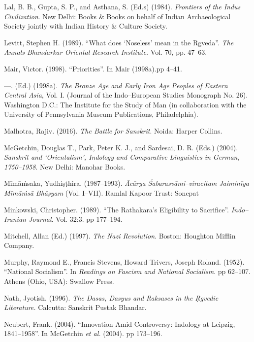 \begin{thebibliography}{99}
  Lal, B. B., Gupta, S. P., and Asthana, S. (Ed.s) (1984).\textit{ Frontiers of the Indus Civilization}. New Delhi: Books \& Books on behalf of Indian Archaeological Society jointly with Indian History \& Culture Society.

  Levitt, Stephen H. (1989). “What does ‘Noseless’ mean in the Rgveda”. \textit{The Annals Bhandarkar Oriental Research Institute.} Vol. 70, pp. 47–63.

  Mair, Victor. (1998). “Priorities”. In Mair (1998a).pp 4–41.

  —. (Ed.) (1998a). \textit{The Bronze Age and Early Iron Age Peoples of Eastern Central Asia}, Vol. I. (Journal of the Indo–European Studies Monograph No. 26). Washington D.C.: The Institute for the Study of Man (in collaboration with the University of Pennsylvania Museum Publications, Philadelphia).

  Malhotra, Rajiv. (2016). \textit{The Battle for Sanskrit}. Noida: Harper Collins.

  McGetchin, Douglas T., Park, Peter K. J., and Sardesai, D. R. (Eds.) (2004). \textit{Sanskrit and ‘Orientalism’, Indology and Comparative Linguistics in German, 1750–1958}. New Delhi: Manohar Books.

  Mīmāṁsaka, Yudhiṣṭhira. (1987–1993). \textit{Ācārya Śabarasvāmi–viracitam Jaiminīya Mīmāṁsā Bhāṣyam} (Vol. I–VII). Ramlal Kapoor Trust: Sonepat

  Minkowski, Christopher. (1989). “The Rathakara’s Eligibility to Sacrifice”. \textit{Indo–Iranian Journal}. Vol. 32:3. pp 177–194.

  Mitchell, Allan (Ed.) (1997). \textit{The Nazi Revolution}. Boston: Houghton Mifflin Company.

  Murphy, Raymond E., Francis Stevens, Howard Trivers, Joseph Roland. (1952). “National Socialism”. In \textit{Readings on Fascism and National Socialism}. pp 62–107. Athens (Ohio, USA): Swallow Press.

  Nath, Jyotish. (1996). \textit{The Dasas, Dasyus and Raksases in the Ṛgvedic Literature.} Calcutta: Sanskrit Pustak Bhandar.

  Neubert, Frank. (2004). “Innovation Amid Controversy: Indology at Leipzig, 1841–1958”. In McGetchin \textit{et al.} (2004). pp 173–196.


\end{thebibliography}
